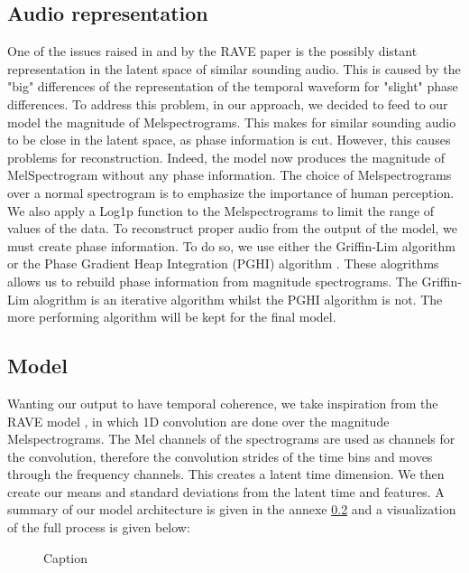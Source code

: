 \documentclass{article}
\begin{document}
\subsection{Audio representation}

One of the issues raised in and by the RAVE paper \cite{caillonRAVEVariationalAutoencoder2021} is the possibly distant representation in the latent space of similar sounding audio. This is caused by the "big" differences of the representation of the temporal waveform for "slight" phase differences. To address this problem, in our approach, we decided to feed to our model the magnitude of Melspectrograms. This makes for similar sounding audio to be close in the latent space, as phase information is cut. However, this causes problems for reconstruction. Indeed, the model now produces the magnitude of MelSpectrogram without any phase information. The choice of Melspectrograms over a normal spectrogram is to emphasize the importance of human perception. We also apply a Log1p function to the Melspectrograms to limit the range of values of the data. 
To reconstruct proper audio from the output of the model, we must create phase information. To do so, we use either the Griffin-Lim algorithm \cite{griff1984} or the Phase Gradient Heap Integration (PGHI) algorithm \cite{pghi2017}. These alogrithms allows us to rebuild phase information from magnitude spectrograms. The Griffin-Lim alogrithm is an iterative algorithm whilst the PGHI algorithm is not. The more performing algorithm will be kept for the final model. 

\subsection{Model}

Wanting our output to have temporal coherence, we take inspiration from the RAVE model \cite{caillonRAVEVariationalAutoencoder2021}, in which 1D convolution are done over the magnitude Melspectrograms. The Mel channels of the spectrograms are used as channels for the convolution, therefore the convolution strides of the time bins and moves through the frequency channels. This creates a latent time dimension. We then create our means and standard deviations from the latent time and features. A summary of our model architecture is given in the annexe \ref{} and a visualization of the full process is given below:

\begin{figure}
    \centering
    
    \caption{Caption}
    \label{fig:enter-label}
\end{figure}
\end{document}
